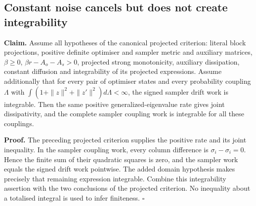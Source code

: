 \documentclass[11pt,a4paper]{report}
\begin{document}
\subsection{\texorpdfstring{Constant noise cancels but does not create integrability}{Constant noise cancels but does not create integrability}}


\textbf{Claim.} Assume all hypotheses of the canonical projected criterion: literal block projections, positive definite optimiser and sampler metric and auxiliary matrices, \(\beta\ge0\), \(\beta r-A_o-A_s>0\), projected strong monotonicity, auxiliary dissipation, constant diffusion and integrability of its projected expressions. Assume additionally that for every pair of optimiser states and every probability coupling \(\Lambda\) with \(\int(1+\|z\|^2+\|z'\|^2)d\Lambda<\infty\), the signed sampler drift work is integrable. Then the same positive generalized-eigenvalue rate gives joint dissipativity, and the complete sampler coupling work is integrable for all these couplings.



\textbf{Proof.} The preceding projected criterion supplies the positive rate and its joint inequality. In the sampler coupling work, every column difference is \(\sigma_i-\sigma_i=0\). Hence the finite sum of their quadratic squares is zero, and the sampler work equals the signed drift work pointwise. The added domain hypothesis makes precisely that remaining expression integrable. Combine this integrability assertion with the two conclusions of the projected criterion. No inequality about a totalised integral is used to infer finiteness. \(\square\)
\end{document}
